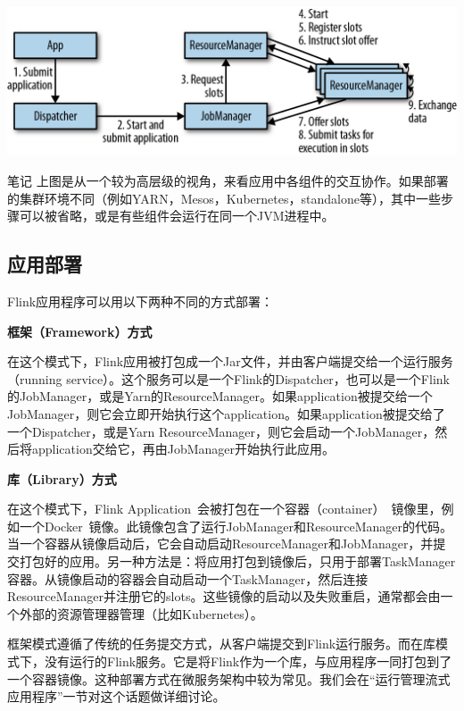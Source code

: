 \documentclass[oneside]{ctexbook}
\begin{document}
\noindent \includegraphics[width=\textwidth]{spaf_0301.png}

\begin{bclogo}[logo=\bcinfo, couleurBarre=orange, noborder=true, couleur=white]{笔记}
上图是从一个较为高层级的视角，来看应用中各组件的交互协作。如果部署的集群环境不同（例如YARN，Mesos，Kubernetes，standalone等），其中一些步骤可以被省略，或是有些组件会运行在同一个JVM进程中。
\end{bclogo}

\subsection{应用部署}

Flink应用程序可以用以下两种不同的方式部署：

\textbf{框架（Framework）方式}

在这个模式下，Flink应用被打包成一个Jar文件，并由客户端提交给一个运行服务（running service）。这个服务可以是一个Flink的Dispatcher，也可以是一个Flink的JobManager，或是Yarn的ResourceManager。如果application被提交给一个JobManager，则它会立即开始执行这个application。如果application被提交给了一个Dispatcher，或是Yarn ResourceManager，则它会启动一个JobManager，然后将application交给它，再由JobManager开始执行此应用。

\textbf{库（Library）方式}

在这个模式下，Flink Application 会被打包在一个容器（container） 镜像里，例如一个Docker 镜像。此镜像包含了运行JobManager和ResourceManager的代码。当一个容器从镜像启动后，它会自动启动ResourceManager和JobManager，并提交打包好的应用。另一种方法是：将应用打包到镜像后，只用于部署TaskManager容器。从镜像启动的容器会自动启动一个TaskManager，然后连接ResourceManager并注册它的slots。这些镜像的启动以及失败重启，通常都会由一个外部的资源管理器管理（比如Kubernetes）。

框架模式遵循了传统的任务提交方式，从客户端提交到Flink运行服务。而在库模式下，没有运行的Flink服务。它是将Flink作为一个库，与应用程序一同打包到了一个容器镜像。这种部署方式在微服务架构中较为常见。我们会在“运行管理流式应用程序”一节对这个话题做详细讨论。
\end{document}

